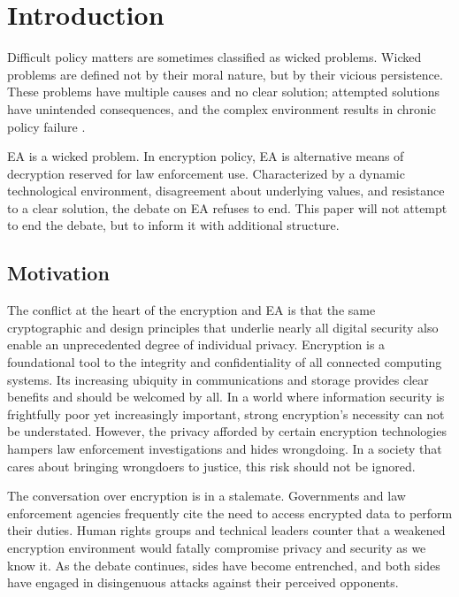 \chapter{Introduction}
\label{chap-introduction}

Difficult policy matters are sometimes classified as wicked problems. Wicked problems are defined not by their moral
nature, but by their vicious persistence. These problems have multiple causes and no clear solution; attempted solutions
have unintended consequences, and the complex environment results in chronic policy failure
\cite{commission_tackling_2018}.

\Acl{EA} is a wicked problem. In encryption policy, \ac{EA} is alternative means of decryption reserved for law
enforcement use. Characterized by a dynamic technological environment, disagreement about underlying values, and
resistance to a clear solution, the debate on \acl{EA} refuses to end. This paper will not attempt to end the debate,
but to inform it with additional structure.


\section{Motivation}
\label{sec-motivation}

The conflict at the heart of the encryption and \acl{EA} is that the same cryptographic and design principles that
underlie nearly all digital security also enable an unprecedented degree of individual privacy. Encryption is a
foundational tool to the integrity and confidentiality of all connected computing systems. Its increasing ubiquity in
communications and storage provides clear benefits and should be welcomed by all. In a world where information security
is frightfully poor yet increasingly important, strong encryption's necessity can not be understated. However, the
privacy afforded by certain encryption technologies hampers law enforcement investigations and hides wrongdoing. In a
society that cares about bringing wrongdoers to justice, this risk should not be ignored.

The conversation over encryption is in a stalemate. Governments and law enforcement agencies frequently cite the need to
access encrypted data to perform their duties. Human rights groups and technical leaders counter that a weakened
encryption environment would fatally compromise privacy and security as we know it. As the debate continues, sides have
become entrenched, and both sides have engaged in disingenuous attacks against their perceived opponents.

